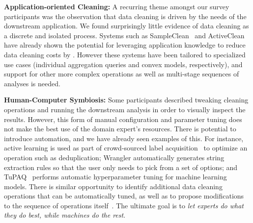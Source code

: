 % 
\vspace{0.5em}
\noindent\textbf{Application-oriented Cleaning:}  A recurring theme amongst our survey participants was the observation that data cleaning is driven by the needs of the downstream application.  We found surprisingly little evidence of data cleaning as a discrete and isolated process. Systems such as SampleClean~\cite{DBLP:journals/debu/KrishnanWFGKM015} and ActiveClean~\cite{activecleanarxiv} have already shown the potential for leveraging application knowledge to reduce data cleaning costs by {\color{red}{an order of magnitude or more}}.  However these systems have been tailored to specialized use cases (individual aggregation queries and convex models, respectively), and support for other more complex operations as well as multi-stage sequences of analyses is needed.

\vspace{0.5em}
\noindent\textbf{Human-Computer Symbiosis:}   Some participants described tweaking cleaning operations and running the downstream analysis in order to visually inspect the results.  However, this form of manual configuration and parameter tuning does not make the best use of the domain expert's resources.   There is potential to introduce automation, and we have already seen examples of this.  For instance, active learning is used as part of crowd-sourced label acquisition~\cite{gokhale2014corleone,DBLP:journals/pvldb/HaasW0F15} to optimize an operation such as deduplication;  Wrangler automatically generates string extraction rules so that the user only needs to pick from a set of options; and TuPAQ~\cite{sparks2015automating} performs automatic hyperparameter tuning for machine learning models.   There is similar opportunity to identify additional data cleaning operations that can be automatically tuned, as well as to propose modifications to the sequence of operations itself~\cite{wisteria}.  The ultimate goal is to {\it let experts do what they do best, while machines do the rest}. 


